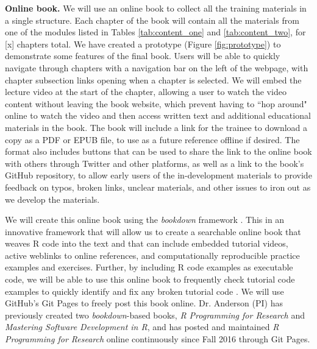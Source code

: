\documentclass[pdftex,english,11pt,parskip=half]{scrartcl}
\begin{document}
\textbf{Online book.} We will use an online book to collect all the training
materials in a single structure. Each chapter of the book will contain all the
materials from one of the modules listed in Tables \ref{tab:content_one} and
\ref{tab:content_two}, for [x] chapters total. We have created a prototype
(Figure \ref{fig:prototype}) to demonstrate some features of the final book.
Users will be able to quickly navigate through chapters with a navigation bar on
the left of the webpage, with chapter subsection links opening when a chapter is
selected. We will embed the lecture video at the start of the chapter, allowing
a user to watch the video content without leaving the book website, which
prevent having to ``hop around" online to watch the video and then access
written text and additional educational materials in the book. The book will
include a link for the trainee to download a copy as a PDF or EPUB file, to use
as a future reference offline if desired. The format also includes buttons that
can be used to share the link to the online book with others through Twitter and
other platforms, as well as a link to the book's GitHub repository, to allow
early users of the in-development materials to provide feedback on typos, broken
links, unclear materials, and other issues to iron out as we develop the
materials. 

We will create this online book using the \textit{bookdown} framework
\cite{xie2016bookdown}. This in an innovative framework that will allow us to
create a searchable online book that weaves R code into the text and that can
include embedded tutorial videos, active weblinks to online references, and
computationally reproducible practice examples and exercises. Further, by
including R code examples as executable code, we will be able to use this online
book to frequently check tutorial code examples to quickly identify and fix any
broken tutorial code \cite{xie2016bookdown}. We will use GitHub's Git Pages to
freely post this book online. Dr. Anderson (PI) has previously created two
\textit{bookdown}-based books, \textit{R Programming for Research} and
\textit{Mastering Software Development in R}, and has posted and maintained
\textit{R Programming for Research} online continuously since Fall 2016 through
Git Pages.  
\end{document}

